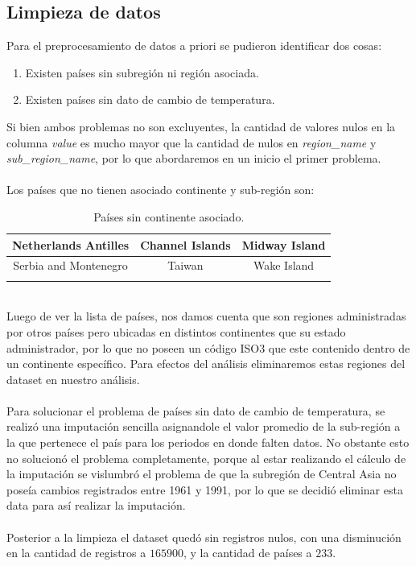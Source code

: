 \documentclass[12pt]{article}
\begin{document}
\subsection{Limpieza de datos}
Para el preprocesamiento de datos a priori se pudieron identificar dos cosas:
\begin{enumerate}
    \item Existen países sin subregión ni región asociada.
    \item Existen países sin dato de cambio de temperatura.
\end{enumerate}
Si bien ambos problemas no son excluyentes, la cantidad de valores nulos en la columna \textit{value} es mucho mayor que la cantidad de nulos en \textit{region\_name} y \textit{sub\_region\_name}, por lo que abordaremos en un inicio el primer problema.\\ \\
Los países que no tienen asociado continente y sub-región son:
\begin{table}[htb]
    \centering
    \begin{tabular}{!{\vrule width 2pt}c|c|c!{\vrule width 2pt}}
        Netherlands Antilles & Channel Islands & Midway Island\\
        \hline
        Serbia and Montenegro & Taiwan & Wake Island\\
    \end{tabular}
    \caption{Países sin continente asociado.}
    \label{ta:table_2}
\end{table}\\ 
Luego de ver la lista de países, nos damos cuenta que son regiones administradas por otros países pero ubicadas en distintos continentes que su estado administrador, por lo que no poseen un código ISO3 que este contenido dentro de un continente específico. Para efectos del análisis eliminaremos estas regiones del dataset en nuestro análisis.\\ \\
Para solucionar el problema de países sin dato de cambio de temperatura, se realizó una imputación sencilla asignandole el valor promedio de la sub-región a la que pertenece el país para los periodos en donde falten datos. No obstante esto no solucionó el problema completamente, porque al estar realizando el cálculo de la imputación se vislumbró el problema de que la subregión de Central Asia no poseía cambios registrados entre 1961 y 1991, por lo que se decidió eliminar esta data para así realizar la imputación.\\ \\
Posterior a la limpieza el dataset quedó sin registros nulos, con una disminución en la cantidad de registros a $165900$, y la cantidad de países a $233$.\newpage
\end{document}
